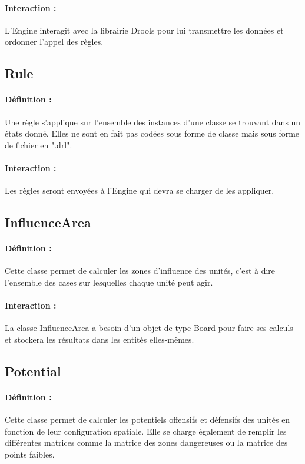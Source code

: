 			\paragraph{Interaction :}
			L'Engine interagit avec la librairie Drools pour lui transmettre les données et ordonner l'appel des règles.

		\subsection*{Rule}

			\paragraph{Définition :}
			Une règle s'applique sur l'ensemble des instances d'une classe se trouvant dans un états donné.
			Elles ne sont en fait pas codées sous forme de classe mais sous forme de fichier en ".drl". 
			\paragraph{Interaction :}
			Les règles seront envoyées à l'Engine qui devra se charger de les appliquer.

		\subsection*{InfluenceArea}

			\paragraph{Définition :}
			Cette classe permet de calculer les zones d'influence des unités, c'est à dire l'ensemble des cases sur lesquelles 
			chaque unité peut agir.
			\paragraph{Interaction :}
			La classe InfluenceArea a besoin d'un objet de type Board pour faire ses calculs et stockera les résultats dans 
			les entités elles-mêmes.

		\subsection*{Potential}

			\paragraph{Définition :}
			Cette classe permet de calculer les potentiels offensifs et défensifs des unités en fonction de leur configuration spatiale.
			Elle se charge également de remplir les différentes matrices comme la matrice des zones dangereuses ou la matrice des points faibles.
